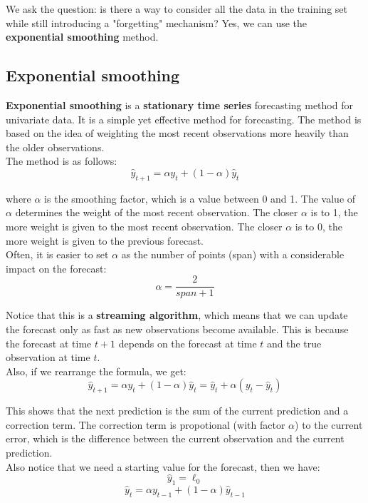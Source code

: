 We ask the question: is there a way to consider all the data in the training set
while still introducing a "forgetting" mechanism? Yes, we can use the \textbf{exponential
smoothing} method.

\subsection{Exponential smoothing}

\textbf{Exponential smoothing} is a \textbf{stationary time series} forecasting method for univariate 
data. It is a simple yet effective method for forecasting. The method is based on the idea
of weighting the most recent observations more heavily than the older observations.\\

The method is as follows:
$$\hat{y}_{t+1} = \alpha y_t + (1 - \alpha) \hat{y}_t$$

where $\alpha$ is the smoothing factor, which is a value between 0 and 1. The value
of $\alpha$ determines the weight of the most recent observation. The closer $\alpha$
is to 1, the more weight is given to the most recent observation. The closer $\alpha$
is to 0, the more weight is given to the previous forecast.\\

Often, it is easier to set $\alpha$ as the number of points (span) with a 
considerable impact on the forecast:
$$\alpha = \frac{2}{span + 1}$$

Notice that this is a \textbf{streaming algorithm}, which means that we can update
the forecast only as fast as new observations become available. This is because
the forecast at time $t+1$ depends on the forecast at time $t$ and the true observation
at time $t$. \\

Also, if we rearrange the formula, we get:
$$\hat{y}_{t+1} = \alpha y_t + (1 - \alpha) \hat{y}_t = \hat{y}_t + \alpha(y_t - \hat{y}_t)$$

This shows that the next prediction is the sum of the current prediction and a correction
term. The correction term is propotional (with factor $\alpha$) to the current error, 
which is the difference between the current observation and the current prediction.\\

Also notice that we need a starting value for the forecast, then we have:
$$\hat{y}_1 = \ell_0$$
$$\hat{y}_{t} = \alpha y_{t-1} + (1 - \alpha) \hat{y}_{t-1}$$

